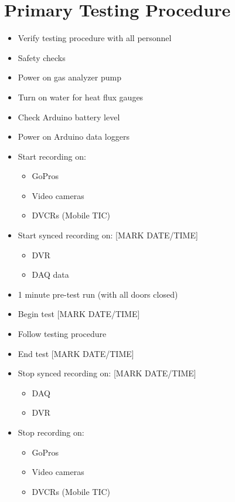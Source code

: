 \documentclass[11pt,oneside]{book}
\begin{document}
\section{Primary Testing Procedure}

\begin{itemize}
\item Verify testing procedure with all personnel
\item Safety checks

\item Power on gas analyzer pump

\item Turn on water for heat flux gauges

\item Check Arduino battery level
\item Power on Arduino data loggers

\item Start recording on:
    \begin{itemize}
    \item GoPros
    \item Video cameras
    \item DVCRs (Mobile TIC)
    \end{itemize}

\item Start synced recording on: [MARK DATE/TIME]
    \begin{itemize}
    \item DVR
    \item DAQ data
    \end{itemize}

\item 1 minute pre-test run (with all doors closed)

\item Begin test [MARK DATE/TIME]

\item Follow testing procedure

\item End test [MARK DATE/TIME]

\item Stop synced recording on: [MARK DATE/TIME]
    \begin{itemize}
    \item DAQ
    \item DVR
    \end{itemize}

\item Stop recording on:
    \begin{itemize}
    \item GoPros
    \item Video cameras
    \item DVCRs (Mobile TIC)
    \end{itemize}


\end{itemize}
\end{document}
